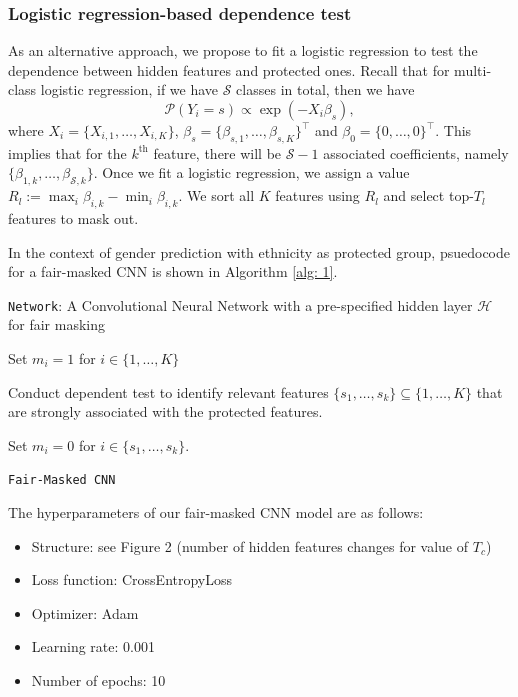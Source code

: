 \subsubsection*{Logistic regression-based dependence test}
As an alternative approach, we propose to fit a logistic regression to test the dependence between hidden features and protected ones. Recall that for multi-class logistic regression, if we have $\mathcal{S}$ classes in total, then we have
$$
\mathcal{P}(Y_i = s) \propto \exp{(-X_i\beta_s)},
$$
where $X_i = \{X_{i,1}, \dots, X_{i,K}\}$, $\beta_s = \{\beta_{s,1}, \dots, \beta_{s,K}\}^{\top}$ and $\beta_0 = \{0, \dots, 0\}^{\top}$. This implies that for the $k^{\text{th}}$ feature, there will be $\mathcal{S} - 1$ associated coefficients, namely $\{\beta_{1,k}, \dots, \beta_{\mathcal{S},k}\}$. Once we fit a logistic regression, we assign a value $R_l := \max_i\beta_{i,k} - \min_i\beta_{i,k}$. We sort all $K$ features using $R_l$ and select top-$T_l$ features to mask out.

In the context of gender prediction with ethnicity as protected group, psuedocode for a fair-masked CNN is shown in Algorithm \ref{alg: 1}.

\begin{algorithm}[H]
	\texttt{Network}: A Convolutional Neural Network with a pre-specified hidden layer $\mathcal{H}$ for fair masking
	
	Set $m_i = 1$ for $i \in \{1, \dots, K\}$
	
	Conduct dependent test to identify relevant features $\{s_1, \dots, s_k\} \subseteq \{1, \dots, K\}$ that are strongly associated with the protected features.
	
	Set $m_i = 0$ for $i \in \{s_1, \dots, s_k\}$.
	
	\caption{\texttt{Fair-Masked CNN}}
	\label{alg: 1}
\end{algorithm}

The hyperparameters of our fair-masked CNN model are as follows:
\begin{itemize}
    \item Structure: see Figure 2 (number of hidden features changes for value of $T_c$)
    \item Loss function: CrossEntropyLoss
    \item Optimizer: Adam
    \item Learning rate: 0.001
    \item Number of epochs: 10
\end{itemize}

